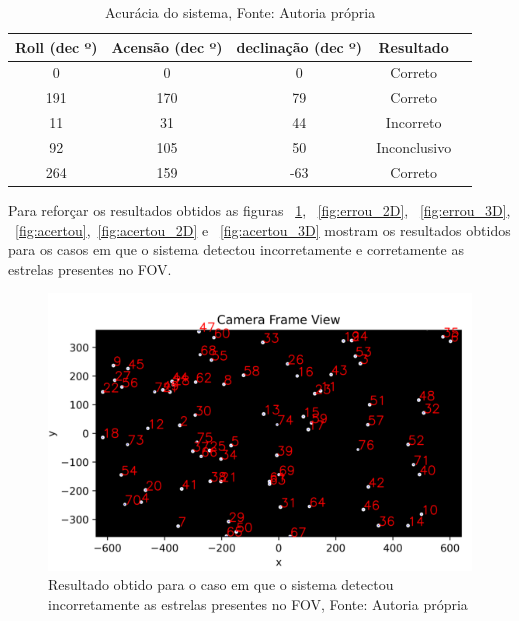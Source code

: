 \begin{table}[ht]
    \centering

    \begin{tabular}{|c|c|c|c|c|}
        \hline
        \textbf{Roll (dec º)} & \textbf{Acensão (dec º)} & \textbf{declinação (dec º)} & \textbf{Resultado} \\ \hline
        0                     & 0                        & 0                           & Correto            \\ \hline
        191                   & 170                      & 79                          & Correto            \\ \hline
        11                    & 31                       & 44                          & Incorreto          \\ \hline
        92                    & 105                      & 50                          & Inconclusivo       \\ \hline
        264                   & 159                      & -63                         & Correto            \\ \hline
    \end{tabular}
    \caption{Acurácia do sistema, Fonte: Autoria própria}
    \label{tab:acuracia}
\end{table}

Para reforçar os resultados obtidos as figuras ~\ref{fig:errou}, ~\ref{fig:errou_2D}, ~\ref{fig:errou_3D}, ~\ref{fig:acertou},~\ref{fig:acertou_2D} e ~\ref{fig:acertou_3D} mostram os resultados obtidos para os casos em que o sistema detectou incorretamente e corretamente as estrelas presentes no FOV.

\begin{figure}[H]
    \centering
    \includegraphics[width=1\textwidth]{images/errou.png}
    \caption{Resultado obtido para o caso em que o sistema detectou incorretamente as estrelas presentes no FOV, Fonte: Autoria própria}
    \label{fig:errou}
\end{figure}

